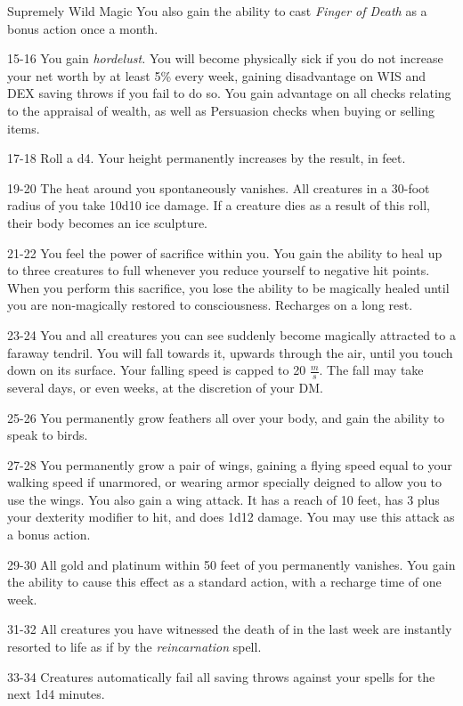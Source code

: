 \begin{rolltable}[0.6\textheight/0pt]{Supremely Wild Magic}
You also gain the ability to cast \textit{Finger of Death} as a bonus action once a month.
\item[15-16] You gain \textit{hordelust.}
You will become physically sick if you do not increase your net worth by at least 5\% every week, gaining disadvantage on WIS and DEX saving throws if you fail to do so.
You gain advantage on all checks relating to the appraisal of wealth, as well as Persuasion checks when buying or selling items.
\item[17-18]  Roll a d4. Your height permanently increases by the result, in feet.
\item[19-20] The heat around you spontaneously vanishes.
All creatures in a 30-foot radius of you take 10d10 ice damage. 
If a creature dies as a result of this roll, their body becomes an ice sculpture.
\item[21-22] You feel the power of sacrifice within you.
You gain the ability to heal up to three creatures to full whenever you reduce yourself to negative hit points.
When you perform this sacrifice, you lose the ability to be magically healed until you are non-magically restored to consciousness.
Recharges on a long rest.
\item[23-24] You and all creatures you can see suddenly become magically attracted to a faraway tendril. 
You will fall towards it, upwards through the air, until you touch down on its surface.
Your falling speed is capped to 20 $\frac{m}{s}$.
The fall may take several days, or even weeks, at the discretion of your DM.
\item[25-26] You permanently grow feathers all over your body, and gain the ability to speak to birds.
\item[27-28] You permanently grow a pair of wings, gaining a flying speed equal to your walking speed if unarmored, or wearing armor specially deigned to allow you to use the wings.
You also gain a wing attack. 
It has a reach of 10 feet, has 3 plus your dexterity modifier to hit, and does 1d12 damage.
You may use this attack as a bonus action.
\item[29-30] All gold and platinum within 50 feet of you permanently vanishes.
You gain the ability to cause this effect as a standard action, with a recharge time of one week.
\item[31-32] All creatures you have witnessed the death of in the last week are instantly resorted to life as if by the \textit{reincarnation} spell.
\item[33-34] Creatures automatically fail all saving throws against your spells for the next 1d4 minutes.

\end{rolltable}
